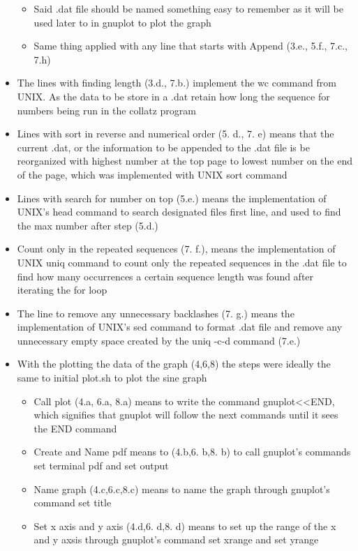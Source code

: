 \documentclass[11pt]{article} %
\begin{document}
\begin{flushleft}
\begin{itemize}
    \begin{itemize}
    \item Said .dat file should be named something easy to remember as it will be used later to in gnuplot to plot the graph
    \item Same thing applied with any line that starts with Append (3.e., 5.f., 7.c., 7.h)
    \end{itemize}
\item The lines with finding length (3.d., 7.b.) implement the wc command from UNIX. As the data to be store in a .dat retain how long the sequence for numbers being run in the collatz program
\item Lines with sort in reverse and numerical order (5. d., 7. e) means that the current .dat, or the information to be appended to the .dat file is be reorganized with highest number at the top page to lowest number on the end of the page, which was implemented with UNIX sort command
\item Lines with search for number on top (5.e.) means the implementation of UNIX’s head command to search designated files first line, and used to find the max number after step (5.d.)
\item Count only in the repeated sequences (7. f.), means the implementation of UNIX uniq command to count only the repeated sequences in the .dat file to find how many occurrences a certain sequence length was found after iterating the for loop
\item The line to remove any unnecessary backlashes (7. g.) means the implementation of UNIX’s sed command to format .dat file and remove any unnecessary empty space created by the uniq -c-d command (7.e.)
\item  With the plotting the data of the graph (4,6,8) the steps were ideally the same to initial plot.sh to plot the sine graph 
    \begin{itemize}
    \item Call plot (4.a, 6.a, 8.a) means to write the command gnuplot<<END, which signifies that gnuplot will follow the next commands until it sees the END command
    \item Create and Name pdf means to (4.b,6. b,8. b) to call gnuplot’s commands set terminal pdf and set output
    \item Name graph (4.c,6.c,8.c) means to name the graph through gnuplot’s command set title
    \item Set x axis and y axis (4.d,6. d,8. d) means to set up the range of the x and y axsis through gnuplot’s command set xrange and set yrange

\end{itemize}
\end{itemize}
\end{flushleft}
\end{document}
